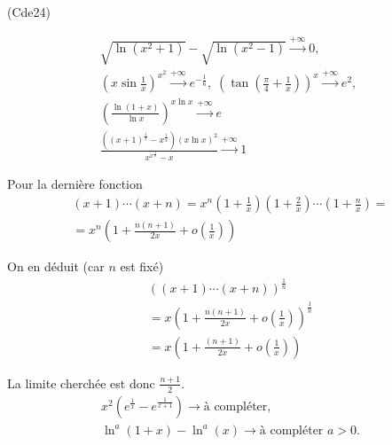 \begin{tiny}(Cde24)\end{tiny}
\begin{multline*}
 \sqrt{\ln (x^{2}+1)}-\sqrt{\ln(x^{2}-1)} \xrightarrow{+\infty} 0 , \;\\
 \left( x\sin \frac{1}{x}\right)^{x^{2}} \xrightarrow{+\infty} e^{-\frac{1}{6}} , \;
 \left( \tan \left( \frac{\pi }{4}+\frac{1}{x}\right) \right) ^{x} \xrightarrow{+\infty} e^{2} , \; \\
 \left( \frac{\ln (1+x)}{\ln x}\right) ^{x\ln x} \xrightarrow{+\infty} e \\
\frac{\left( (x+1)^{\frac1x}-x^{\frac 1x}\right) \left( x\ln x\right) ^2}{x^{x^{\frac 1x}}-x} \xrightarrow{+\infty} 1 
\end{multline*}

Pour la dernière fonction
\begin{multline*}
  (x+1)\cdots(x+n) = x^n (1+\frac{1}{x})(1+\frac{2}{x})\cdots(1+\frac{n}{x})=\\
  =x^n\left(1 + \frac{n(n+1)}{2x} +o(\frac{1}{x})\right) 
\end{multline*}

On en déduit (car $n$ est fixé)
\begin{multline*}
\left((x+1)\cdots(x+n)\right)^\frac{1}{n} \\
= x\left(1 + \frac{n(n+1)}{2x} +o(\frac{1}{x})\right)^{\frac{1}{n}}\\
= x\left(1 + \frac{(n+1)}{2x} +o(\frac{1}{x})\right)
\end{multline*}

La limite cherchée est donc  $\frac{n+1}{2}$.
\begin{multline*}
 x^2\left( e^{\frac{1}{x}} - e^{\frac{1}{x+1}}\right) \rightarrow \text{à compléter}, \; \\
\ln^a(1+x) - \ln^a(x) \rightarrow \text{à compléter } a>0.
\end{multline*}

